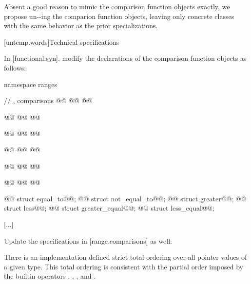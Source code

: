 Absent a good reason to mimic the  comparison function objects
exactly, we propose un--ing the  comparion
function objects, leaving only concrete classes with the same behavior as the
prior  specializations.

[untemp.words]{Technical specifications}

In [functional.syn], modify the declarations of the comparison function objects
as follows:
\begin{codeblock}
  [...]

  namespace ranges {
    // , comparisons
    @@
      @@
    @@

    @@
      @@
    @@

    @@
      @@
    @@

    @@
      @@
    @@

    @@
      @@
    @@

    @@
      @@
    @@

    @@ struct equal_to@@;
    @@ struct not_equal_to@@;
    @@ struct greater@@;
    @@ struct less@@;
    @@ struct greater_equal@@;
    @@ struct less_equal@@;
  }

  [...]
\end{codeblock}

Update the specifications in [range.comparisons] as well:

\setcounter{Paras}{1}
\pnum
There is an implementation-defined strict total ordering over all pointer values
of a given type. This total ordering is consistent with the partial order imposed
by the builtin operators \tcode{<}, \tcode{>}, \tcode{<=}, and \tcode{>=}.

